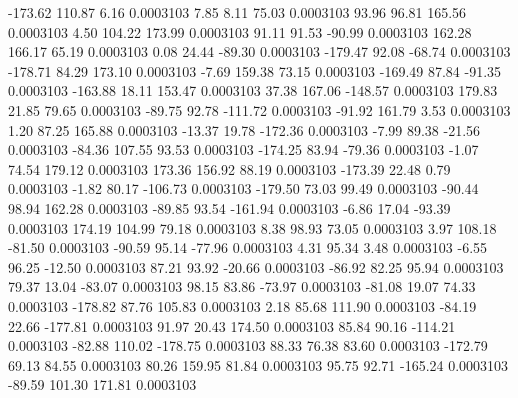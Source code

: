      -173.62      110.87        6.16     0.0003103
        7.85        8.11       75.03     0.0003103
       93.96       96.81      165.56     0.0003103
        4.50      104.22      173.99     0.0003103
       91.11       91.53      -90.99     0.0003103
      162.28      166.17       65.19     0.0003103
        0.08       24.44      -89.30     0.0003103
     -179.47       92.08      -68.74     0.0003103
     -178.71       84.29      173.10     0.0003103
       -7.69      159.38       73.15     0.0003103
     -169.49       87.84      -91.35     0.0003103
     -163.88       18.11      153.47     0.0003103
       37.38      167.06     -148.57     0.0003103
      179.83       21.85       79.65     0.0003103
      -89.75       92.78     -111.72     0.0003103
      -91.92      161.79        3.53     0.0003103
        1.20       87.25      165.88     0.0003103
      -13.37       19.78     -172.36     0.0003103
       -7.99       89.38      -21.56     0.0003103
      -84.36      107.55       93.53     0.0003103
     -174.25       83.94      -79.36     0.0003103
       -1.07       74.54      179.12     0.0003103
      173.36      156.92       88.19     0.0003103
     -173.39       22.48        0.79     0.0003103
       -1.82       80.17     -106.73     0.0003103
     -179.50       73.03       99.49     0.0003103
      -90.44       98.94      162.28     0.0003103
      -89.85       93.54     -161.94     0.0003103
       -6.86       17.04      -93.39     0.0003103
      174.19      104.99       79.18     0.0003103
        8.38       98.93       73.05     0.0003103
        3.97      108.18      -81.50     0.0003103
      -90.59       95.14      -77.96     0.0003103
        4.31       95.34        3.48     0.0003103
       -6.55       96.25      -12.50     0.0003103
       87.21       93.92      -20.66     0.0003103
      -86.92       82.25       95.94     0.0003103
       79.37       13.04      -83.07     0.0003103
       98.15       83.86      -73.97     0.0003103
      -81.08       19.07       74.33     0.0003103
     -178.82       87.76      105.83     0.0003103
        2.18       85.68      111.90     0.0003103
      -84.19       22.66     -177.81     0.0003103
       91.97       20.43      174.50     0.0003103
       85.84       90.16     -114.21     0.0003103
      -82.88      110.02     -178.75     0.0003103
       88.33       76.38       83.60     0.0003103
     -172.79       69.13       84.55     0.0003103
       80.26      159.95       81.84     0.0003103
       95.75       92.71     -165.24     0.0003103
      -89.59      101.30      171.81     0.0003103
